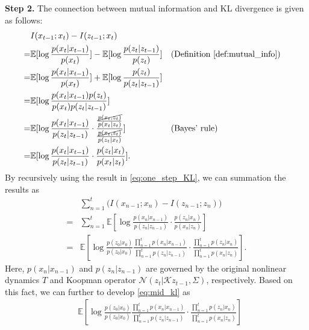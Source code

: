 \documentclass{article} %
\begin{document}
\begin{proofwithframe}
\textbf{Step 2.} The connection between mutual information and KL divergence is given as follows:
\begin{equation} \label{eq:one_step_KL}
\begin{aligned}
    & I(x_{t-1}; x_t) - I(z_{t-1}; x_t)  \\
    = &  \mathbb{E} [\log \frac{p(x_t|x_{t-1})}{p(x_{t})} ]  - \mathbb{E} [\log \frac{p(z_t|z_{t-1})}{p(z_{t})} ]  && \text{(Definition~\ref{def:mutual_info})} \\
    = & \mathbb{E} [\log \frac{p(x_t|x_{t-1})}{p(x_{t})} ] + \mathbb{E} [\log \frac{p(z_{t})}{p(z_t|z_{t-1})} ] \\
    = & \mathbb{E} [ \log \frac{p(x_t|x_{t-1}) p(z_{t})}{p(x_t) p(z_t|z_{t-1})} ] \\
    = &  \mathbb{E} [\log  \frac{p(x_t|x_{t-1})}{ p(z_t|z_{t-1})} \cdot \frac{ \frac{\cancel{p(x_t,z_t)}}{p(x_t|z_t)}}{\frac{\cancel{p(x_t,z_t)}}{p(z_t|x_t)}} ] && \text{(Bayes' rule)} \\ 
    = & \mathbb{E} [ \log  \frac{p(x_t|x_{t-1})}{p(z_t|z_{t-1})} \cdot \frac{p(z_t|x_t)}{p(x_t|z_t)}] .
\end{aligned}
\end{equation}
By recursively using the result in \eqref{eq:one_step_KL}, we can summation the results as 
\begin{equation} \label{eq:mid_kl}
\begin{split} 
    & \sum_{n=1}^t \big( I(x_{n-1}; x_n) - I(z_{n-1}; z_n) \big) \\
    = &   \sum_{n=1}^t \mathbb{E} [ \log  \frac{p(x_n|x_{n-1})}{p(z_n|z_{n-1})} \cdot \frac{p(z_n|x_n)}{p(x_n|z_n)}] \\
    = &   \mathbb{E} [ \log  \frac{p(z_0|x_0)}{p(z_0|x_0)} \frac{ \prod_{n = 1}^t p(x_n|x_{n-1})}{\prod_{n = 1}^t p(z_n|z_{n-1})} \cdot \frac{\prod_{n = 1}^t p(z_n|x_n)}{\prod_{n = 1}^t p(x_n|z_n)}].
\end{split}
\end{equation}
Here, $p(x_n|x_{n-1})$ and $p(z_n|z_{n-1})$ are governed by the original nonlinear dynamics $T$ and Koopman operator $\mathcal{N}(z_t|\mathcal{K}z_{t-1}, \Sigma)$, respectively. Based on this fact, we can further to develop \eqref{eq:mid_kl} as 
\begin{equation} \label{eq:upper_bound_info}
\begin{split}
    & \mathbb{E} [ \log  \frac{p(z_0|x_0)}{p(z_0|x_0)} \frac{ \prod_{n = 1}^t p(x_n|x_{n-1})}{\prod_{n = 1}^t p(z_n|z_{n-1})} \cdot \frac{\prod_{n = 1}^t p(z_n|x_n)}{\prod_{n = 1}^t p(x_n|z_n)}] \\

\end{split}
\end{equation}
\end{proofwithframe}
\end{document}

